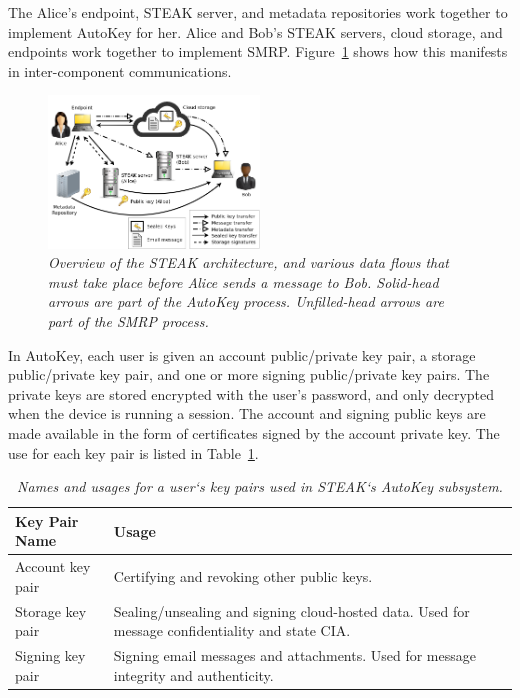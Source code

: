 The Alice’s endpoint, STEAK server, and metadata repositories work together to implement AutoKey for her.  Alice and Bob’s STEAK servers, cloud storage, and endpoints work together to implement SMRP.  Figure~\ref{fig:overview} shows how this manifests in inter-component communications.

\begin{figure}[h!]
\centering
\includegraphics[width=0.5\textwidth]{figures/overview}
\caption{\it Overview of the STEAK architecture, and various data flows that must take place before Alice sends a message to Bob.  Solid-head arrows are part of the AutoKey process.  Unfilled-head arrows are part of the SMRP process.}
\label{fig:overview}
\end{figure}


In AutoKey, each user is given an account public/private key pair, a storage public/private key pair, and one or more signing public/private key pairs.  The private keys are stored encrypted with the user’s password, and only decrypted when the device is running a session.  The account and signing public keys are made available in the form of certificates signed by the account private key.  The use for each key pair is listed in Table~\ref{tab:keypairs}.

\begin{table}[ht!]
\begin{tabular}{ | l | p{14cm} |}
\hline
\textbf{Key Pair Name} & \textbf{Usage} \\
\hline
Account key pair & Certifying and revoking other public keys. \\
Storage key pair & Sealing/unsealing and signing cloud-hosted data.  Used for message confidentiality and state CIA. \\
Signing key pair & Signing email messages and attachments.  Used for message integrity and authenticity. \\
\hline
\end{tabular}
\caption{\it Names and usages for a user`s key pairs used in STEAK`s AutoKey subsystem.}
\label{tab:keypairs}
\end{table}


